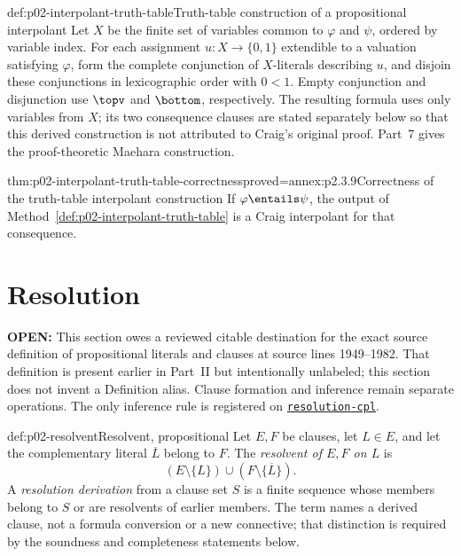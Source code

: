 \begin{hbmethod}{def:p02-interpolant-truth-table}{Truth-table construction of a propositional interpolant}
Let \(X\) be the finite set of variables common to \(\varphi\) and \(\psi\),
ordered by variable index.
For each assignment \(u:X\to\{0,1\}\) extendible to a valuation satisfying
\(\varphi\), form the complete conjunction of \(X\)-literals describing
\(u\), and disjoin these conjunctions in lexicographic order with \(0<1\).  Empty
conjunction and disjunction use \(\topv\) and \(\bottom\), respectively.
The resulting formula uses only variables from \(X\); its two consequence
clauses are stated separately below so that this derived construction is not
attributed to Craig's original proof.
Part~7 gives the proof-theoretic Maehara construction.
\end{hbmethod}

\begin{hblemma}{thm:p02-interpolant-truth-table-correctness}{proved=annex:p2.3.9}{Correctness of the truth-table interpolant construction}
If \(\varphi\entails\psi\), the output of
Method~\ref{def:p02-interpolant-truth-table} is a Craig interpolant for that
consequence.
\end{hblemma}

\section{Resolution}
\label{sec:p02-prop-resolution}

\textbf{OPEN:} This section owes a reviewed citable destination for the exact
source definition of propositional literals and clauses at source lines
1949--1982.  That definition is present earlier in Part~II but intentionally
unlabeled; this section does not invent a Definition alias.  Clause formation
and inference remain separate operations.  The only inference rule is registered on
\hyperref[sheet:resolution-cpl]{\texttt{resolution-cpl}}.

\begin{hbdefinition}{def:p02-resolvent}{Resolvent, propositional}
Let \(E,F\) be clauses, let \(L\in E\), and let the complementary literal
\(\overline L\) belong to \(F\).  The \emph{resolvent of \(E,F\) on \(L\)}
is
\[
 (E\setminus\{L\})\cup(F\setminus\{\overline L\}).
\]
A \emph{resolution derivation} from a clause set \(S\) is a finite sequence
whose members belong to \(S\) or are resolvents of earlier members.
The term names a derived clause, not a formula conversion or a new connective;
that distinction is required by the soundness and completeness statements
below.
\end{hbdefinition}

